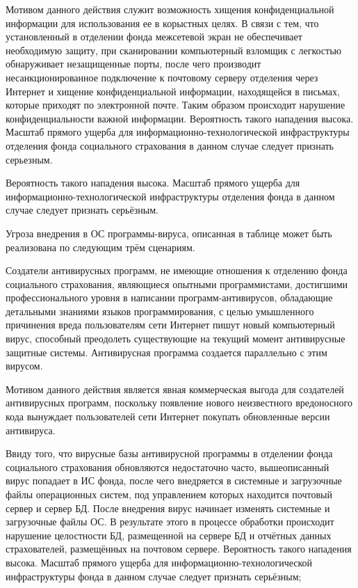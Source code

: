 Мотивом данного действия служит возможность хищения конфиденциальной
информации для использования ее в корыстных целях. В связи с тем, что
установленный в отделении фонда межсетевой экран не обеспечивает
необходимую защиту, при сканировании компьютерный взломщик с легкостью
обнаруживает незащищенные порты, после чего производит
несанкционированное подключение к почтовому серверу отделения через
Интернет и хищение конфиденциальной информации, находящейся в письмах,
которые приходят по электронной почте. Таким образом происходит
нарушение конфиденциальности важной информации. Вероятность такого
нападения высока. Масштаб прямого ущерба для
информационно-технологической инфраструктуры отделения фонда
социального страхования в данном случае следует признать серьезным.

Вероятность такого нападения высока. Масштаб прямого ущерба для
информационно-технологической инфраструктуры отделения фонда в данном
случае следует признать серьёзным.

\point Угроза внедрения в ОС программы-вируса, описанная в таблице
может быть реализована по следующим трём сценариям.

\point Создатели антивирусных программ, не имеющие отношения к
отделению фонда социального страхования, являющиеся опытными
программистами, достигшими профессионального уровня в написании
программ-антивирусов, обладающие детальными знаниями языков
программирования, с целью умышленного причинения вреда пользователям
сети Интернет пишут новый компьютерный вирус, способный преодолеть
существующие на текущий момент антивирусные защитные
системы. Антивирусная программа создается параллельно с этим вирусом.

Мотивом данного действия является явная коммерческая выгода для
создателей антивирусных программ, поскольку появление нового
неизвестного вредоносного кода вынуждает пользователей сети Интернет
покупать обновленные версии антивируса.

Ввиду того, что вирусные базы антивирусной программы в отделении фонда
социального страхования обновляются недостаточно часто, вышеописанный
вирус попадает в ИС фонда, после чего внедряется в системные и
загрузочные файлы операционных систем, под управлением которых
находится почтовый сервер и сервер БД. После внедрения вирус начинает
изменять системные и загрузочные файлы ОС. В результате этого в
процессе обработки происходит нарушение целостности БД, размещенной на
сервере БД и отчётных данных страхователей, размещённых на почтовом
сервере. Вероятность такого нападения высока. Масштаб прямого ущерба
для информационно-технологической инфраструктуры фонда в данном случае
следует признать серьёзным;

